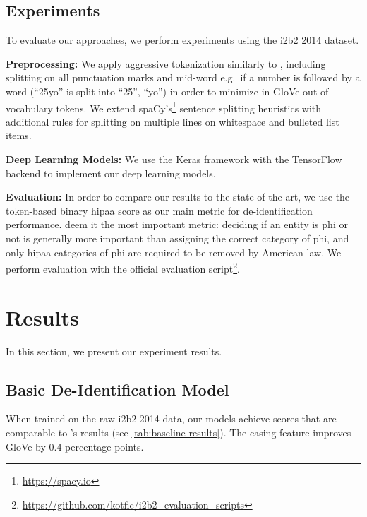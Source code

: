 \subsection{Experiments}
%
To evaluate our approaches, we perform experiments using the i2b2 2014 dataset.

\textbf{Preprocessing:}
%
We apply aggressive tokenization similarly to \citet{liu2017identification}, including splitting on all punctuation marks and mid-word e.g.\ if a number is followed by a word (``25yo'' is split into ``25'', ``yo'') in order to minimize in GloVe out-of-vocabulary tokens.
%
We extend spaCy's\footnote{\url{https://spacy.io}} sentence splitting heuristics with additional rules for splitting on multiple lines on whitespace and bulleted list items.

\textbf{Deep Learning Models:}
%
We use the Keras framework \citep{chollet2015keras} with the TensorFlow backend \citep{abadi2015tensorflow} to implement our deep learning models.
%

\textbf{Evaluation:}
%
In order to compare our results to the state of the art, we use the token-based binary \ac{hipaa} \fone score as our main metric for de-identification performance.
%
\citet{dernoncourt2017identification} deem it the most important metric: deciding if an entity is \ac{phi} or not is generally more important than assigning the correct category of \ac{phi}, and only \ac{hipaa} categories of \ac{phi} are required to be removed by American law.
%
We perform evaluation with the official evaluation script\footnote{\url{https://github.com/kotfic/i2b2\_evaluation\_scripts}}.

\section{Results}
%
In this section, we present our experiment results.

\subsection{Basic De-Identification Model}
%
When trained on the raw i2b2 2014 data, our models achieve \fone scores that are comparable to \citeauthor{dernoncourt2017identification}'s results (see \cref{tab:baseline-results}).
%
The casing feature improves GloVe by $0.4$ percentage points.

